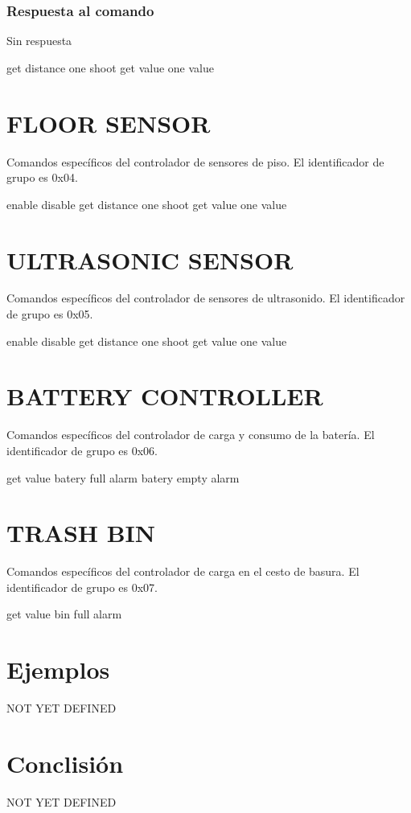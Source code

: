 \documentclass[a4paper,11pt]{article}
\begin{document}
\subsubsection*{Respuesta al comando}
\label{set_all_d_comando_respuesta}

Sin respuesta








get distance
one shoot
get value
one value

\section{FLOOR SENSOR} 
\label{grupo_floor_sensor}

Comandos espec\'ificos del controlador de sensores de piso.
El identificador de grupo es 0x04.

enable
disable
get distance
one shoot
get value
one value

\section{ULTRASONIC SENSOR} 
\label{grupo_ultrasonic_sensor}

Comandos espec\'ificos del controlador de sensores de ultrasonido.
El identificador de grupo es 0x05.

enable
disable
get distance
one shoot
get value
one value

\section{BATTERY CONTROLLER} 
\label{grupo_battery_controller}

Comandos espec\'ificos del controlador de carga y consumo de la bater\'ia.
El identificador de grupo es 0x06.

get value
batery full alarm
batery empty alarm

\section{TRASH BIN} 
\label{grupo_trash_bin}

Comandos espec\'ificos del controlador de carga en el cesto de basura.
El identificador de grupo es 0x07.

get value
bin full alarm

\section{Ejemplos}
\label{ejemplos}

NOT YET DEFINED

\section{Conclisi\'on}
\label{conclusion}

NOT YET DEFINED
\end{document}
